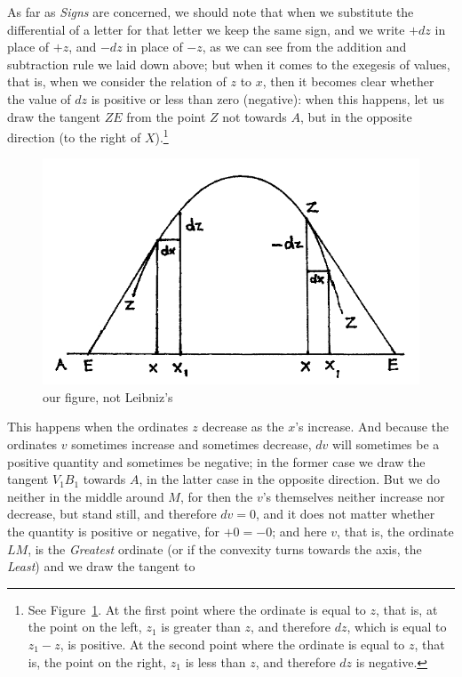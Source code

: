 \documentclass[twoside,openright]{article}
\begin{document}
As far as {\em Signs} are concerned, we should note that when we
substitute the differential of a letter for that letter we keep the
same sign, and we write $+dz$ in place of $+z$, and $-dz$ in place of
$-z$, as we can see from the addition and subtraction rule we laid
down above; but when it comes to the exegesis of values, that is, when
we consider the relation of $z$ to $x$, then it becomes clear whether
the value of $dz$ is positive or less than zero (negative): when this
happens, let us draw the tangent $ZE$ from the point $Z$ not towards
$A$, but in the opposite direction (to the right of $X$).\footnote{See
  Figure~\ref{incrdecr}.  At the first point where the ordinate is
  equal to $z$, that is, at the point on the left, $z_1$ is greater
  than $z$, and therefore $dz$, which is equal to $z_1 -z$, is
  positive.  At the second point where the ordinate is equal to $z$,
  that is, the point on the right, $z_1$ is less than $z$, and
  therefore $dz$ is negative.}
\begin{figure}[htp]
  \begin{center}
    \includegraphics[width=.75\textwidth]{fig/Figure4}
    \caption{our figure, not Leibniz's}
    \label{incrdecr}
  \end{center}
\end{figure}
This happens when the ordinates $z$ decrease as the $x$'s increase.
And because the ordinates $v$ sometimes increase and sometimes
decrease, $dv$ will sometimes be a positive quantity and sometimes be
negative; in the former case we draw the tangent $V_1B_1$ towards $A$,
in the latter case in the opposite direction.
\label{dvzero}
But we do neither in the middle around $M$, for then the $v$'s
themselves neither increase nor decrease, but stand still, and
therefore $dv = 0$, and it does not matter whether the quantity is
positive or negative, for $+0 = -0$; and here $v$, that is, the
ordinate $LM$, is the {\em Greatest} ordinate (or if the convexity
turns towards the axis, the {\em Least}) and we draw the tangent to
\end{document}
